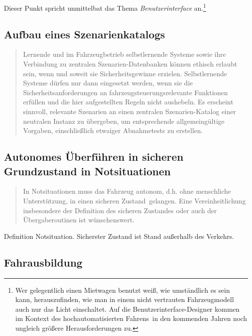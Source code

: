 \documentclass[twoside,a4paper,12pt]{article}
\begin{document}
Dieser Punkt spricht unmittelbat das Thema \textit{Benutzerinterface} an.\footnote{Wer gelegentlich einen Mietwagen benutzt weiß, wie 
umständlich es sein kann, herauszufinden, wie man in einem nicht vertrauten Fahrzeugmodell auch nur das Licht einschaltet. Auf die
Benutzerinterface-Designer kommen im Kontext des \glqq hochautomatisierten Fahrens\grqq\ in den kommenden Jahren noch ungleich größere
Herausforderungen zu.}

\subsection{Aufbau eines Szenarienkatalogs} \label{AufbauEinesSzenarienkatalogs}

\begin{quote}
\glqq
Lernende und im Fahrzeugbetrieb selbstlernende Systeme sowie ihre Verbindung zu zentralen Szenarien-Datenbanken 
können ethisch erlaubt sein, wenn und soweit sie Sicherheitsgewinne erzielen. Selbstlernende Systeme dürfen nur dann eingesetzt werden, wenn
sie die Sicherheitsanforderungen an fahrzeugsteuerungsrelevante Funktionen erfüllen
und die hier aufgestellten Regeln nicht aushebeln. Es erscheint sinnvoll, relevante Szenarien an einen zentralen 
Szenarien-Katalog einer neutralen Instanz zu übergeben, um
entsprechende allgemeingültige Vorgaben, einschließlich etwaiger Abnahmetests zu erstellen.\grqq\mbox{~\cite[S. 13]{ek}}
\end{quote}



\subsection{Autonomes Überführen in sicheren Grundzustand in Notsituationen} \label{AutonomesUeberfuehrenInSicherenGrundzustandInNotsituationen}

\begin{quote}
\glqq
In Notsituationen muss das Fahrzeug autonom, d.h. ohne menschliche Unterstützung, in
einen \glqq sicheren Zustand\grqq\ gelangen. Eine Vereinheitlichung insbesondere der Definition
des sicheren Zustandes oder auch der Übergaberoutinen ist wünschenswert.\grqq\mbox{~\cite[S. 13]{ek}}
\end{quote}

Definition Notsituation. Sicherster Zustand ist Stand außerhalb des Verkehrs.

\subsection{Fahrausbildung} \label{Fahrausbildung}
\end{document}
